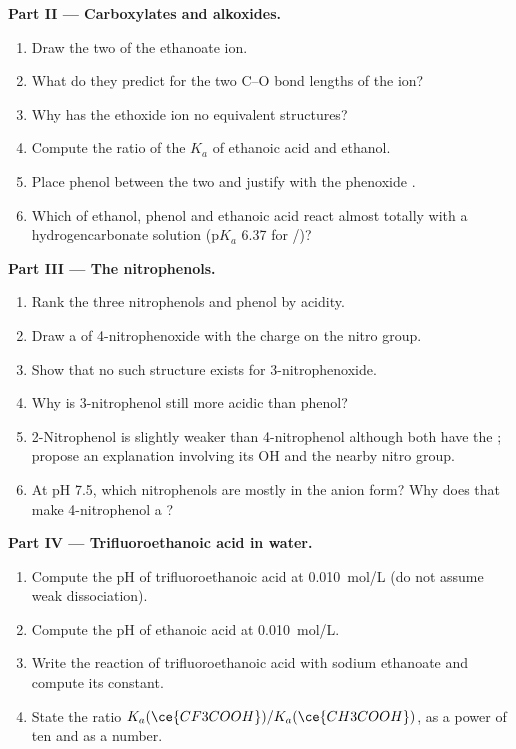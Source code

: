 \begin{problem}
\medskip
\noindent\textbf{Part II --- Carboxylates and alkoxides.}
\begin{enumerate}[resume]
  \item Draw the two  of the ethanoate ion.
  \item What do they predict for the two C--O bond lengths of the ion?
  \item Why has the ethoxide ion no equivalent structures?
  \item Compute the ratio of the $K_a$ of ethanoic acid and ethanol.
  \item Place phenol between the two and justify with the phenoxide
        .
  \item Which of ethanol, phenol and ethanoic acid react almost totally
        with a hydrogencarbonate solution ($\mathrm{p}K_a$ 6.37 for
        /)?
\end{enumerate}

\medskip
\noindent\textbf{Part III --- The nitrophenols.}
\begin{enumerate}[resume]
  \item Rank the three nitrophenols and phenol by acidity.
  \item Draw a  of 4-nitrophenoxide with the charge on
        the nitro group.
  \item Show that no such structure exists for 3-nitrophenoxide.
  \item Why is 3-nitrophenol still more acidic than phenol?
  \item 2-Nitrophenol is slightly weaker than 4-nitrophenol although both
        have the ; propose an explanation involving its
        OH and the nearby nitro group.
  \item At pH 7.5, which nitrophenols are mostly in the anion form? Why
        does that make 4-nitrophenol a ?
\end{enumerate}

\medskip
\noindent\textbf{Part IV --- Trifluoroethanoic acid in water.}
\begin{enumerate}[resume]
  \item Compute the pH of trifluoroethanoic acid at \qty{0.010}{mol/L}
        (do not assume weak dissociation).
  \item Compute the pH of ethanoic acid at \qty{0.010}{mol/L}.
  \item Write the reaction of trifluoroethanoic acid with sodium ethanoate
        and compute its constant.
  \item State the ratio $K_a(\ce{CF3COOH})/K_a(\ce{CH3COOH})$, as a power
        of ten and as a number.
\end{enumerate}
\end{problem}
